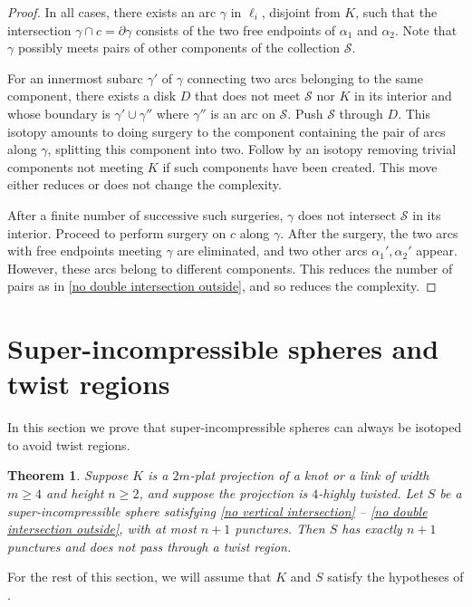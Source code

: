 \documentclass[12pt,reqno]{amsart}
\theoremstyle{plain}
\newtheorem{theorem}{Theorem}[section]
\theoremstyle{definition}
\newcommand{\calS}{\mathcal{S}}
\begin{document}
\begin{proof}
In all cases, there exists an arc $\gamma$ in $\ell_i$, disjoint from $K$, such that 
the intersection $\gamma \cap c = \partial \gamma$ consists of the two free endpoints 
of $\alpha_1$ and $\alpha_2$. Note that $\gamma$ possibly meets pairs of other 
components of the collection $\calS$.

For an innermost subarc $\gamma'$ of $\gamma$ connecting two arcs belonging 
to the same component, there exists a disk $D$ that does not meet $\calS$ 
nor $K$ in its interior and  whose boundary is $\gamma'\cup\gamma''$ where 
$\gamma''$ is an arc on $\calS$. Push $\calS$ through $D$. This 
isotopy amounts to doing surgery to the component containing the pair of arcs 
along $\gamma$, splitting this component into two. Follow by an isotopy removing 
trivial components not meeting $K$ if such components have been created. This move 
either reduces or does not change the complexity.

After a finite number of successive such surgeries, $\gamma$ does not intersect 
$\calS$ in its interior. Proceed to perform surgery on $c$ along $\gamma$. After 
the surgery, the two arcs with free endpoints meeting $\gamma$ are eliminated, 
and two other arcs $\alpha_1',\alpha_2'$ appear. However, these arcs belong to 
different components. This reduces the number of pairs as in 
\ref{no double intersection outside}, and so reduces the complexity. 
\end{proof}

\section{Super-incompressible spheres and twist regions}
\label{sec:NoTwistRegions}

In this section we prove that super-incompressible spheres can always be 
isotoped to avoid twist regions. 

\begin{theorem}\label{thm: notwistregions}
Suppose $K$ is a $2m$-plat projection of a knot or a link of width 
$m\geq 4$ and height $n\geq 2$, and suppose the projection is $4$-highly twisted. 
Let $S$ be a super-incompressible sphere satisfying \ref{no vertical intersection}
-- \ref{no double intersection outside}, with at most  $n+1$ punctures. Then $S$ 
has exactly $n+1$ punctures and does  not pass through a twist region.
\end{theorem}

For the rest of this section, we will assume that $K$ and $S$ satisfy 
the hypotheses of .
\end{document}
